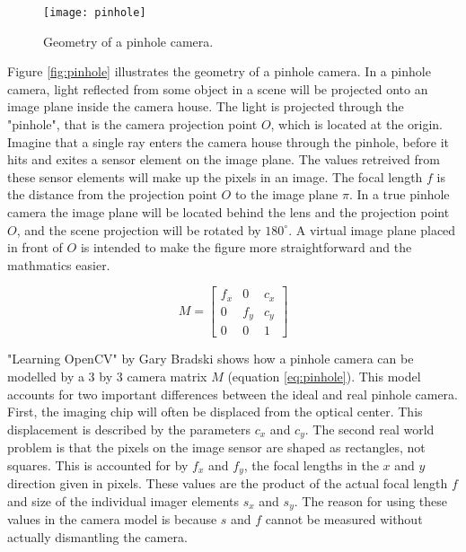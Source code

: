 \begin{wrapfigure}{r}{0.65\textwidth}
	\vspace{-10pt} %
	\centering
	\texttt{[image: pinhole]}
	\caption{\label{fig:pinhole}Geometry of a pinhole camera.}
	\vspace{-10pt} %
	\label{phantompic}
\end{wrapfigure}

Figure \ref{fig:pinhole} illustrates the geometry of a pinhole camera. In a pinhole camera, light reflected from some object in a scene will be projected onto an image plane inside the camera house. The light is projected through the "pinhole", that is the camera projection point $O$, which is located at the origin. Imagine that a single ray enters the camera house through the pinhole, before it hits and exites a sensor element on the image plane. The values retreived from these sensor elements will make up the pixels in an image. The focal length $f$ is the distance from the projection point $O$ to the image plane $\pi$. In a true pinhole camera the image plane will be located behind the lens and the projection point $O$, and the scene projection will be rotated by $180^{\circ}$. A virtual image plane placed in front of $O$ is intended to make the figure more straightforward and the mathmatics easier. 

\begin{equation}
M = \begin{bmatrix}
f_x & 0 & c_x \\
0 & f_y & c_y \\
0 & 0 & 1
\end{bmatrix}
\label{eq:pinhole}
\end{equation}

"Learning OpenCV" by Gary Bradski\cite{oreillycv} shows how a pinhole camera can be modelled by a 3 by 3 camera matrix $M$ (equation \ref{eq:pinhole}). This model accounts for two important differences between the ideal and real pinhole camera. First, the imaging chip will often be displaced from the optical center. This displacement is described by the parameters $c_x$ and $c_y$. The second real world problem is that the pixels on the image sensor are shaped as rectangles, not squares. This is accounted for by $f_x$ and $f_y$, the focal lengths in the $x$ and $y$ direction given in pixels. These values are the product of the actual focal length $f$ and size of the individual imager elements $s_x$ and $s_y$. The reason for using these values in the camera model is because $s$ and $f$ cannot be measured without actually dismantling the camera\cite{oreillycv}.

